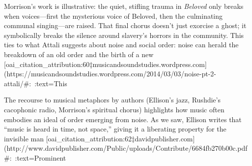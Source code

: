 \documentclass[12pt]{report}
\begin{document}
   Morrison’s work is illustrative: the quiet, stifling trauma in \textit{Beloved} only breaks when voices—first the mysterious voice of Beloved, then the culminating communal singing—are raised. That final chorus doesn’t just exorcise a ghost; it symbolically breaks the silence around slavery’s horrors in the community. This ties to what Attali suggests about noise and social order: noise can herald the breakdown of an old order and the birth of a new [oai_citation_attribution:60‡musicandsoundstudies.wordpress.com](https://musicandsoundstudies.wordpress.com/2014/03/03/noise-pt-2-attali/#:~:text=This%

   The recourse to musical metaphors by authors (Ellison’s jazz, Rushdie’s cacophonic radio, Morrison’s spiritual chorus) highlights how music often embodies an ideal of order emerging from noise. As we saw, Ellison writes that “music is heard in time, not space,” giving it a liberating property for the invisible man [oai_citation_attribution:62‡davidpublisher.com](http://www.davidpublisher.com/Public/uploads/Contribute/6684fb270b00c.pdf#:~:text=Prominent%
\end{document}
